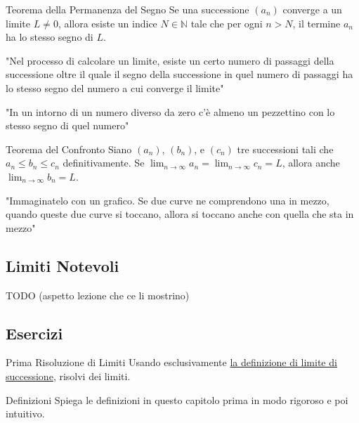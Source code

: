 \documentclass{article}
\begin{document}
\begin{theorem}{Teorema della Permanenza del Segno}{}
    Se una successione $(a_n)$ converge a un limite $L \neq 0$, allora esiste un indice $N \in \mathbb{N}$ tale che per ogni $n > N$, il termine $a_n$ ha lo stesso segno di $L$.

    "Nel processo di calcolare un limite, esiste un certo numero di passaggi della successione oltre il quale il segno della successione in quel numero di passaggi ha lo stesso segno del numero a cui converge il limite"

    "In un intorno di un numero diverso da zero c'è almeno un pezzettino con lo stesso segno di quel numero"
\end{theorem}

\begin{theorem}{Teorema del Confronto}{}
    Siano $(a_n)$, $(b_n)$, e $(c_n)$ tre successioni tali che $a_n \le b_n \le c_n$ definitivamente. Se $\lim_{n \to \infty} a_n = \lim_{n \to \infty} c_n = L$, allora anche $\lim_{n \to \infty} b_n = L$.

    "Immaginatelo con un grafico. Se due curve ne comprendono una in mezzo, quando queste due curve si toccano, allora si toccano anche con quella che sta in mezzo"
\end{theorem}

\subsection{Limiti Notevoli}

TODO (aspetto lezione che ce li mostrino)

\subsection{Esercizi}

\begin{exercise}{Prima Risoluzione di Limiti}{}
    Usando esclusivamente \hyperref[def:limite]{la definizione di limite di successione}, risolvi dei limiti.
\end{exercise}

\begin{exercise}{Definizioni}{}
    Spiega le definizioni in questo capitolo prima in modo rigoroso e poi intuitivo.
\end{exercise}
\end{document}
